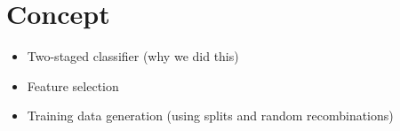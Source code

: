 \section{Concept}
\label{sec:concept}

\begin{itemize}
	\item Two-staged classifier (why we did this)
	\item Feature selection
	\item Training data generation (using splits and random recombinations)
\end{itemize}

